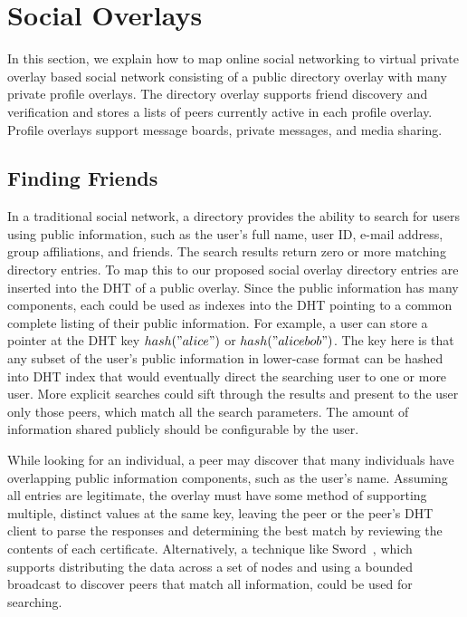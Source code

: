 \documentclass[conference]{IEEEtran}
\begin{document}
\section{Social Overlays}
\label{social_overlays}

In this section, we explain how to map online social networking to virtual
private overlay based social network consisting of a public directory overlay
with many private profile overlays.  The directory overlay supports friend
discovery and verification and stores a lists of peers currently active in
each profile overlay.  Profile overlays support message boards, private
messages, and media sharing.

\subsection{Finding Friends}

In a traditional social network, a directory provides the ability to search for
users using public information, such as the user's full name, user ID, e-mail
address, group affiliations, and friends.  The search results return zero or
more matching directory entries.  To map this to our proposed social overlay
directory entries are inserted into the DHT of a public overlay.  Since the
public information has many components, each could be used as indexes into the
DHT pointing to a common complete listing of their public information.  For
example, a user can store a pointer at the DHT key $hash("alice")$ or
$hash("alice bob")$.  The key here is that any subset of the user's public
information in lower-case format can be hashed into DHT index that would
eventually direct the searching user to one or more user.  More explicit
searches could sift through the results and present to the user only those
peers, which match all the search parameters.  The amount of information shared
publicly should be configurable by the user.  

While looking for an individual, a peer may discover that many individuals
have overlapping public information components, such as the user's name.
Assuming all entries are legitimate, the overlay must have some method of
supporting multiple, distinct values at the same key, leaving the peer or the
peer's DHT client to parse the responses and determining the best match by
reviewing the contents of each certificate.  Alternatively, a technique like
Sword~\cite{sword}, which supports distributing the data across a set of nodes
and using a bounded broadcast to discover peers that match all information,
could be used for searching.
\end{document}
